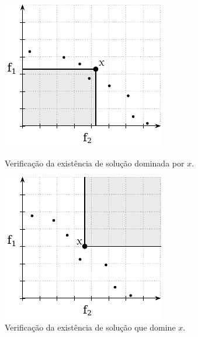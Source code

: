 \begin{figure}[!ht]
  \centering
  \begin{minipage}[b]{0.42\textwidth}
    \includegraphics[width=\textwidth]{img/mokp/pnt-reg}
    \caption{Verificação da existência de solução dominada por $x$.}
    \label{img:pnt-reg}
  \end{minipage}
  \hfill
  \begin{minipage}[b]{0.42\textwidth}
    \includegraphics[width=\textwidth]{img/mokp/pnt-reg-minus}
    \caption{Verificação da existência de solução que domine $x$.}
    \label{img:pnt-reg-minus}
  \end{minipage}
\end{figure}

